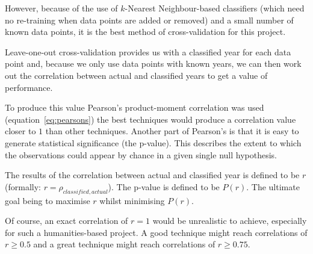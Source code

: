 However, because of the use of $k$-Nearest Neighbour-based classifiers (which need no re-training 
when data points are added or removed) and a small number of known data points, it is the best 
method of cross-validation for this project.

Leave-one-out cross-validation provides us with a classified year for each data point and, because
we only use data points with known years, we can then work out the correlation between actual and
classified years to get a value of performance.

To produce this value Pearson's product-moment correlation was used (equation~\ref{eq:pearsons})
the best techniques would produce a correlation value closer to $1$ than other techniques. Another
part of Pearson's is that it is easy to generate statistical significance (the p-value). This
describes the extent to which the observations could appear by chance in a given single null
hypothesis.

The results of the correlation between actual and classified year is defined to be $r$ 
(formally: $r=\rho_{classified, actual}$). The p-value is defined to be $P(r)$. The ultimate goal 
being to maximise $r$ whilst minimising $P(r)$.

Of course, an exact correlation of $r=1$ would be unrealistic to achieve, especially for such a 
humanities-based project. A good technique might reach correlations of $r \ge 0.5$ and a great
technique might reach correlations of $r \ge 0.75$.



